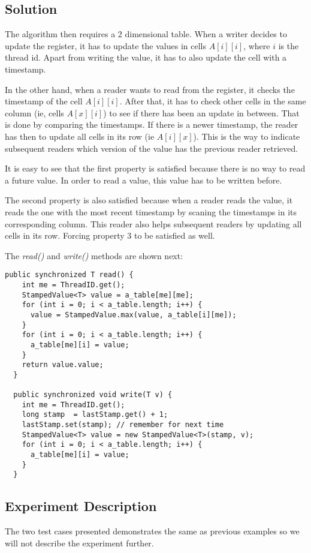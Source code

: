\subsection{Solution}
The algorithm then requires a 2 dimensional table. When a writer decides to
update the register, it has to update the values in cells $A[i][i]$, where $i$
is the thread id. Apart from writing the value, it has to also update the cell
with a timestamp. 
\par
In the other hand, when a reader wants to read from the register, it checks the
timestamp of the cell $A[i][i]$. After that, it has to check other cells in the
same column (ie, cells $A[x][i]$) to see if there has been an update in between.
That is done by comparing the timestamps. If there is a newer timestamp, the
reader has then to update all cells in its row (ie $A[i][x]$). This is the way
to indicate subsequent readers which version of the value has the previous
reader retrieved.
\par
It is easy to see that the first property is satisfied because there is no way
to read a future value. In order to read a value, this value has to be written
before.
\par
The second property is also satisfied because when a reader reads the value, it
reads the one with the most recent timestamp by scaning the timestamps in its
corresponding column. This reader also helps subsequent readers by updating all
cells in its row. Forcing property 3 to be satisfied as well.
\par
The \textit{read()} and \textit{write()} methods are shown next:
\par
\begin{lstlisting}[style=numbers]
  public synchronized T read() {
    int me = ThreadID.get();
    StampedValue<T> value = a_table[me][me];
    for (int i = 0; i < a_table.length; i++) {
      value = StampedValue.max(value, a_table[i][me]);
    }
    for (int i = 0; i < a_table.length; i++) {
      a_table[me][i] = value;
    }
    return value.value;
  }

  public synchronized void write(T v) {
    int me = ThreadID.get();
    long stamp  = lastStamp.get() + 1;
    lastStamp.set(stamp); // remember for next time
    StampedValue<T> value = new StampedValue<T>(stamp, v);
    for (int i = 0; i < a_table.length; i++) {
      a_table[me][i] = value;
    }
  }
\end{lstlisting}
\hfill
\subsection{Experiment Description}
\par 
The two test cases presented demonstrates the same as previous examples so we
will not describe the experiment further. 
\par
